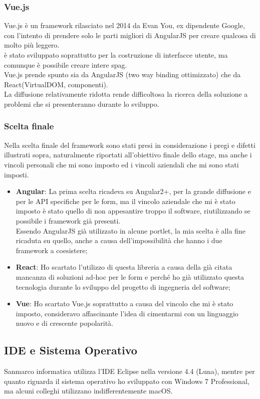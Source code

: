 \subsubsection{Vue.js}
Vue.js è un framework rilasciato nel 2014 da Evan You, ex dipendente Google, con l'intento di prendere solo le parti migliori di AngularJS per creare qualcosa di molto più leggero.\\
è stato sviluppato soprattutto per la costruzione di interfacce utente, ma comunque è possibile creare intere \gls{spag}.\\
Vue.js prende spunto sia da AngularJS (two way binding ottimizzato) che da React(VirtualDOM, componenti). \\
La diffusione relativamente ridotta rende difficoltosa la ricerca della soluzione a problemi che si presenteranno durante lo sviluppo.

\subsubsection{Scelta finale}
Nella scelta finale del framework sono stati presi in considerazione i pregi e difetti illustrati sopra, naturalmente riportati all'obiettivo finale dello stage, ma anche i vincoli personali che mi sono imposto ed i vincoli aziendali che mi sono stati imposti.
\begin{itemize}
	\item \textbf{Angular}: La prima scelta ricadeva su Angular2+, per la grande diffusione e per le API specifiche per le form, ma il vincolo aziendale che mi è stato imposto è stato quello di non appesantire troppo il software, riutilizzando se possibile i framework già presenti.\\
	Essendo AngularJS già utilizzato in alcune \gls{portlet}, la mia scelta è alla fine ricaduta su quello, anche a causa dell'impossibilità che hanno i due framework a coesistere;
	\item \textbf{React}: Ho scartato l'utilizzo di questa libreria a causa della già citata mancanza di soluzioni ad-hoc per le form e perché ho già utilizzato questa tecnologia durante lo sviluppo del progetto di ingegneria del software;
	\item \textbf{Vue}: Ho scartato Vue.js soprattutto a causa del vincolo che mi è stato imposto, consideravo affascinante l'idea di cimentarmi con un linguaggio nuovo e di crescente popolarità.
\end{itemize}
\subsection{IDE e Sistema Operativo}
Sanmarco informatica utilizza l'IDE Eclipse nella versione 4.4 (Luna), mentre per quanto riguarda il sistema operativo ho sviluppato con Windows 7 Professional, ma alcuni colleghi utilizzano indifferentemente macOS.

